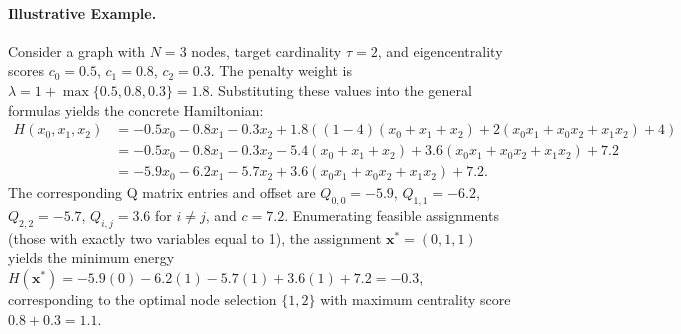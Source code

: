 \documentclass[12pt]{article}
\begin{document}
\paragraph{Illustrative Example.}
Consider a graph with $N = 3$ nodes, target cardinality $\tau = 2$, and eigencentrality scores $c_0 = 0.5$, $c_1 = 0.8$, $c_2 = 0.3$. The penalty weight is $\lambda = 1 + \max\{0.5, 0.8, 0.3\} = 1.8$. Substituting these values into the general formulas yields the concrete Hamiltonian:
\begin{align}
H(x_0, x_1, x_2) &= -0.5x_0 - 0.8x_1 - 0.3x_2 + 1.8 \left( (1 - 4)(x_0 + x_1 + x_2) + 2(x_0x_1 + x_0x_2 + x_1x_2) + 4 \right) \\
&= -0.5x_0 - 0.8x_1 - 0.3x_2 - 5.4(x_0 + x_1 + x_2) + 3.6(x_0x_1 + x_0x_2 + x_1x_2) + 7.2 \\
&= -5.9x_0 - 6.2x_1 - 5.7x_2 + 3.6(x_0x_1 + x_0x_2 + x_1x_2) + 7.2.
\end{align}
The corresponding Q matrix entries and offset are $Q_{0,0} = -5.9$, $Q_{1,1} = -6.2$, $Q_{2,2} = -5.7$, $Q_{i,j} = 3.6$ for $i \neq j$, and $c = 7.2$. Enumerating feasible assignments (those with exactly two variables equal to 1), the assignment $\mathbf{x}^* = (0, 1, 1)$ yields the minimum energy $H(\mathbf{x}^*) = -5.9(0) - 6.2(1) - 5.7(1) + 3.6(1) + 7.2 = -0.3$, corresponding to the optimal node selection $\{1, 2\}$ with maximum centrality score $0.8 + 0.3 = 1.1$.
\end{document}
